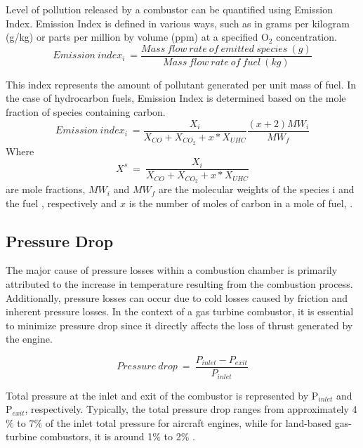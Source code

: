 Level of pollution released by a combustor can be quantified using Emission Index. Emission Index is defined in various ways, such as in grams per kilogram (g/kg) or parts per million by volume (ppm) at a specified O$_2$ concentration. 
\begin{equation}
    Emission\ index_i\ = \frac{Mass\ flow\ rate\ of\ emitted\ species\ (g)}{Mass\ flow\ rate\ of\ fuel\ (kg) }
\end{equation}

This index represents the amount of pollutant generated per unit mass of fuel. In the case of hydrocarbon fuels, Emission Index is determined based on the mole fraction of species containing carbon.
\begin{equation}
    Emission\ index_i\ = \frac{X_i}{X_{CO} + X_{CO_2} + x*X_{UHC}} \frac{(x+2)MW_i}{MW_f}
\end{equation}
Where
\begin{equation*}
    X^s \ = \ \frac{X_i}{X_{CO} + X_{CO_2} + x*X_{UHC}}
\end{equation*} are mole fractions, $MW_i$ and $MW_f$ are the molecular weights of the species i and the fuel \cite{doi:10.2514/6.2012-522}, respectively and $x$ is the number of moles of carbon in a mole of fuel, \cite{doi:10.2514/6.2013-3677}.

\subsection{Pressure Drop}
The major cause of pressure losses within a combustion chamber is primarily attributed to the increase in temperature resulting from the combustion process. Additionally, pressure losses can occur due to cold losses caused by friction and inherent pressure losses. In the context of a gas turbine combustor, it is essential to minimize pressure drop since it directly affects the loss of thrust generated by the engine. 

\begin{equation}
    Pressure\ drop\ = \ \frac{P_{inlet}- P_{exit}}{P_{inlet}}
\end{equation}

Total pressure at the inlet and exit of the combustor is represented by P$_{inlet}$ and P$_{exit}$, respectively. Typically, the total pressure drop ranges from approximately 4$\%$ to 7$\%$ of the inlet total pressure for aircraft engines, while for land-based gas-turbine combustors, it is around 1$\%$ to 2$\%$ \cite{GTT1996}.


